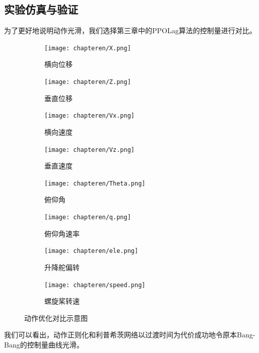 \subsection{实验仿真与验证}
为了更好地说明动作光滑，我们选择第三章中的PPOLag算法的控制量进行对比。
\begin{figure}[H]
    \centering
    \begin{subfigure}{.46\textwidth}
        \centering
        \texttt{[image: chapteren/X.png]}
        \caption{横向位移}
        \label{fig:sub1}
    \end{subfigure}%
    \begin{subfigure}{.46\textwidth}
        \centering
        \texttt{[image: chapteren/Z.png]}
        \caption{垂直位移}
        \label{fig:sub2}
    \end{subfigure}
    \begin{subfigure}{.46\textwidth}
        \centering
        \texttt{[image: chapteren/Vx.png]}
        \caption{横向速度}
        \label{fig:sub3}
    \end{subfigure}%
    \begin{subfigure}{.46\textwidth}
        \centering
        \texttt{[image: chapteren/Vz.png]}
        \caption{垂直速度}
        \label{fig:sub4}
    \end{subfigure}
    \begin{subfigure}{.46\textwidth}
        \centering
        \texttt{[image: chapteren/Theta.png]}
        \caption{俯仰角}
        \label{fig:sub5}
    \end{subfigure}%
    \begin{subfigure}{.46\textwidth}
        \centering
        \texttt{[image: chapteren/q.png]}
        \caption{俯仰角速率}
        \label{fig:sub6}
    \end{subfigure}
    \begin{subfigure}{.46\textwidth}
        \centering
        \texttt{[image: chapteren/ele.png]}
        \caption{升降舵偏转}
        \label{fig:sub7}
    \end{subfigure}%
    \begin{subfigure}{.46\textwidth}
        \centering
        \texttt{[image: chapteren/speed.png]}
        \caption{螺旋桨转速}
        \label{fig:sub8}
    \end{subfigure}
    \caption{动作优化对比示意图}
    \label{fig:action_smooth}
\end{figure}
我们可以看出，动作正则化和利普希茨网络以过渡时间为代价成功地令原本Bang-Bang的控制量曲线光滑。


